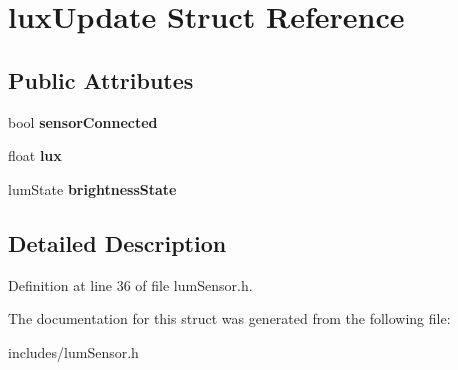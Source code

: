 \hypertarget{structluxUpdate}{}\section{lux\+Update Struct Reference}
\label{structluxUpdate}
\subsection*{Public Attributes}
\begin{DoxyCompactItemize}
\item 
\mbox{\label{structluxUpdate_adffb47b2b86b0327c943e80c22ee1f88}} 
bool {\bfseries sensor\+Connected}
\item 
\mbox{\label{structluxUpdate_aad71a4218ce032245ffdc3f4d831fa10}} 
float {\bfseries lux}
\item 
\mbox{\label{structluxUpdate_a025c2af612355812b7cac8748e4374b2}} 
lum\+State {\bfseries brightness\+State}
\end{DoxyCompactItemize}


\subsection{Detailed Description}


Definition at line 36 of file lum\+Sensor.\+h.



The documentation for this struct was generated from the following file\+:\begin{DoxyCompactItemize}
\item 
includes/lum\+Sensor.\+h\end{DoxyCompactItemize}
